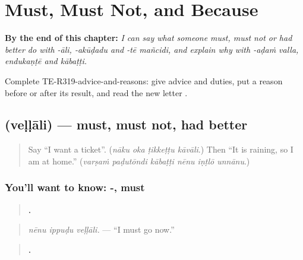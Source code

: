 
\chapter{Must, Must Not, and Because}
\label{ch:te-must-must-not-and-because}

\begin{chapteropening}
\textbf{By the end of this chapter:} \emph{I can say what someone must, must not or had better do with -āli, -akūḍadu and -tē mañcidi, and explain why with -aḍaṁ valla, endukaṇṭē and kābaṭṭi.}

Complete TE-R319-advice-and-reasons: give advice and duties, put a reason before or after its result, and read the new letter .
\end{chapteropening}

\section[\texorpdfstring{\te{వెళ్ళాలి} (veḷḷāli)}{వెళ్ళాలి (veḷḷāli)}]{ (veḷḷāli) — must, must not, had better}

\label{lesson:TE-C319-vellali}



\begin{quote}
Say \textquotedblleft{}I want a ticket\textquotedblright{}. (\emph{nāku oka ṭikkeṭṭu kāvāli}.) Then \textquotedblleft{}It is raining, so I am at home.\textquotedblright{} (\emph{varṣaṁ paḍutōndi kābaṭṭi nēnu iṇṭlō unnānu}.)
\end{quote}

\subsection*{You'll want to know: -, must}
\begin{quote}
\textbf{  .}
\end{quote}

\begin{quote}
\emph{nēnu ippuḍu veḷḷāli.} — \textquotedblleft{}I must go now.\textquotedblright{}
\end{quote}

\begin{quote}
\textbf{     .}
\end{quote}

